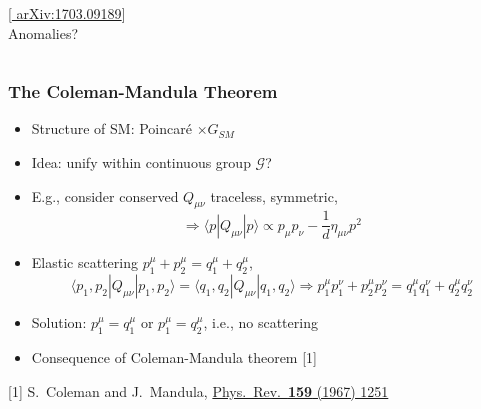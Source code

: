 \documentclass[10pt,aspectratio=169]{beamer}
\begin{document}
\begin{frame}
\begin{columns}[t]
\begin{column}{0.7\textwidth}
\begin{columns}[t]
\begin{column}{0.5\textwidth}
\begin{figure}
          \end{figure}
          \vspace*{-28pt}
          \begin{center}
            {\tiny [\href{http://arxiv.org/abs/1703.09189}{%
                  arXiv:1703.09189}]} \\
            Anomalies?
          \end{center}
        \end{column}
      \end{columns}
    \end{column}
    \end{columns}
\end{frame}

\begin{frame}
  \frametitle{The Coleman-Mandula Theorem}
  \begin{itemize}\itemsep1em
  \item Structure of SM: Poincar\'{e} $\times G_{SM}$
  \item {\color{blue} Idea: unify within continuous group $\mathcal{G}$?}
  \item E.g., consider conserved $Q_{\mu\nu}$ traceless, symmetric,
    \begin{equation*}
      \Rightarrow \langle p | Q_{\mu\nu} | p \rangle \propto p_\mu p_\nu
      - \frac{1}{d} \eta_{\mu\nu} p^2
    \end{equation*}
  \item Elastic scattering $p_1^\mu + p_2^\mu = q_1^\mu + q_2^\mu$,
    \begin{equation*}
      \langle p_1, p_2 | Q_{\mu\nu} | p_1, p_2 \rangle
      = \langle q_1, q_2 | Q_{\mu\nu} | q_1, q_2 \rangle
      \Rightarrow
      p_1^\mu p_1^\nu + p_2^\mu p_2^\nu = q_1^\mu q_1^\nu + q_2^\mu q_2^\nu
    \end{equation*}
  \item Solution: $p_1^\mu = q_1^\mu$ or $p_1^\mu = q_2^\mu$, \alert{i.e.,
    no scattering}
  \item Consequence of {\color{blue} Coleman-Mandula theorem} [1]
  \end{itemize}
      {\tiny [1] S.~Coleman and J.~Mandula,
        \href{http://dx.doi.org/10.1103/PhysRev.159.1251}{%
          Phys.~Rev.~\textbf{159} (1967) 1251} }
\end{frame}
\end{document}
